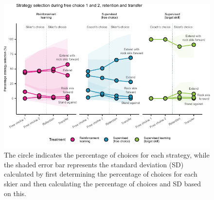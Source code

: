 \documentclass[pdflatex,sn-mathphys-num]{sn-jnl}%
\theoremstyle{thmstyleone}%
\theoremstyle{thmstyletwo}%
\theoremstyle{thmstylethree}%
\begin{document}
\begin{figure}[H]
\centering
\includegraphics{figures/figure_choice_descriptivecount_4.pdf}
\caption{The circle indicates the percentage of choices for each strategy, while the shaded error bar represents the standard deviation (SD) calculated by first determining the percentage of choices for each skier and then calculating the percentage of choices and SD based on this.}\label{fig: choice_descriptives}
\end{figure}
\end{document}
